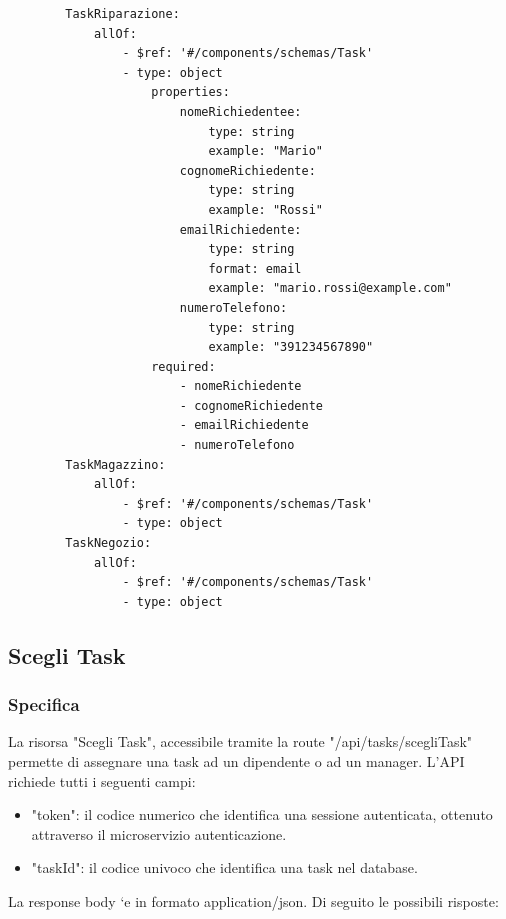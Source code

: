 \documentclass{report}
\begin{document}
\begin{verbatim}
	    TaskRiparazione:
	        allOf:
	            - $ref: '#/components/schemas/Task'
	            - type: object
	                properties:
	                    nomeRichiedentee:
	                        type: string
	                        example: "Mario"
	                    cognomeRichiedente:
	                        type: string
	                        example: "Rossi"
	                    emailRichiedente:
	                        type: string
	                        format: email
	                        example: "mario.rossi@example.com"
	                    numeroTelefono:
	                        type: string
	                        example: "391234567890"
	                required:
	                    - nomeRichiedente
	                    - cognomeRichiedente
	                    - emailRichiedente
	                    - numeroTelefono
	    TaskMagazzino:
	        allOf:
	            - $ref: '#/components/schemas/Task'
	            - type: object
	    TaskNegozio:
	        allOf:
	            - $ref: '#/components/schemas/Task'
	            - type: object
\end{verbatim}

\subsection*{Scegli Task}
\subsubsection*{Specifica}

La risorsa "Scegli Task", accessibile tramite la route "/api/tasks/scegliTask" permette di assegnare una task ad un dipendente o ad un manager. L'API richiede tutti i seguenti campi:

\begin{itemize}
	\item "token": il codice numerico che identifica una sessione autenticata, ottenuto attraverso il microservizio autenticazione.
	\item "taskId": il codice univoco che identifica una task nel database.
\end{itemize}

La response body `e in formato application/json. Di seguito le possibili risposte:
\end{document}

